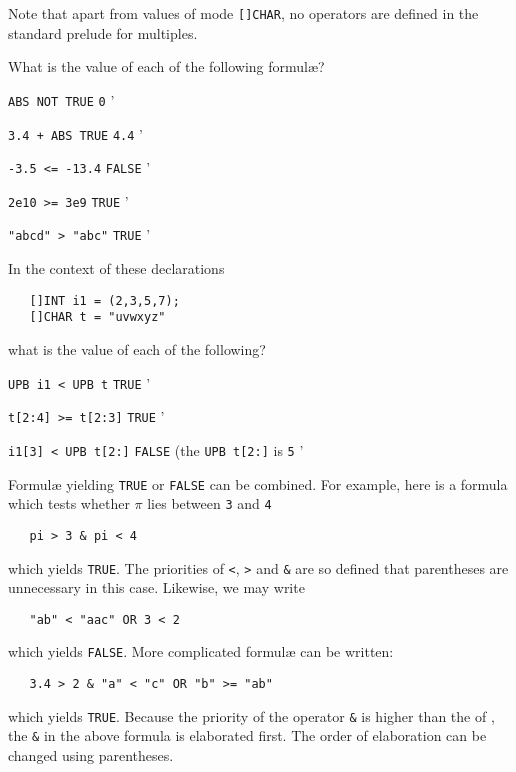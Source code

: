 Note that apart from values of mode \verb|[]CHAR|, no operators are
defined in the standard prelude for multiples.

\begin{exercise}
\item What is the value of each of the following formul{\ae}?
\begin{subex}
\item \verb|ABS NOT TRUE| \subans \verb|0|
'
\item \verb|3.4 + ABS TRUE| \subans \verb|4.4|
'
\item \verb|-3.5 <= -13.4| \subans \verb|FALSE|
'
\item \verb|2e10 >= 3e9| \subans \verb|TRUE|
'
\item \verb|"abcd" > "abc"| \subans \verb|TRUE|
'
\end{subex}
\item In the context of these declarations
\begin{verbatim}
   []INT i1 = (2,3,5,7);
   []CHAR t = "uvwxyz"
\end{verbatim}
\noindent
what is the value of each of the following?
\begin{subex}
\item \verb|UPB i1 < UPB t| \subans \verb|TRUE|
'
\item \verb|t[2:4] >= t[2:3]| \subans \verb|TRUE|
'
\item \verb|i1[3] < UPB t[2:]| \subans \verb|FALSE| (the
\verb|UPB t[2:]| is \verb|5|
'
\end{subex}
\end{exercise}

Formul{\ae} yielding \verb|TRUE| or \verb|FALSE| can be combined. For
example, here is a formula which tests whether $\pi$ lies between
\verb|3| and \verb|4|
\begin{verbatim}
   pi > 3 & pi < 4
\end{verbatim}
\noindent
which yields \verb|TRUE|. The priorities of \verb|<|, \verb|>| and
\verb|&| are so defined that parentheses are unnecessary in this
case.  Likewise, we may write
\begin{verbatim}
   "ab" < "aac" OR 3 < 2
\end{verbatim}
\noindent
which yields \verb|FALSE|. More complicated formul{\ae} can be
written:
\begin{verbatim}
   3.4 > 2 & "a" < "c" OR "b" >= "ab"
\end{verbatim}
\noindent
which yields \verb|TRUE|. Because the priority of the operator
\verb|&| is higher than the  of , the \verb|&|
in the above formula is elaborated first. The order of elaboration
can be changed using parentheses.

